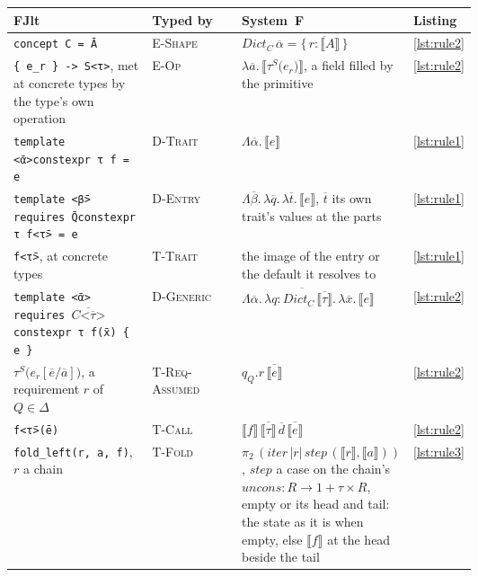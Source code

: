 \begin{table}[ht]
\centering
\small
\begin{tabularx}{\linewidth}{@{}>{\raggedright\arraybackslash}p{0.31\linewidth}>{\raggedright\arraybackslash}p{0.2\linewidth}>{\raggedright\arraybackslash}X>{\raggedright\arraybackslash}p{0.09\linewidth}@{}}
\toprule
FJlt & Typed by & System~F & Listing \\
\midrule
\texttt{concept C = Ā} & \textsc{E-Shape} & $\mathit{Dict}_C\,\overline{\alpha} = \{\,\overline{r : \llbracket A \rrbracket}\,\}$ & \ref{lst:rule2} \\
\texttt{\{ e\_r \} -> S<τ>}, met at concrete types by the type's own operation & \textsc{E-Op} & $\lambda\overline{a}.\,\llbracket \tau^{S}\texttt{(}e_r\texttt{)} \rrbracket$, a field filled by the primitive & \ref{lst:rule2} \\
\texttt{template <ᾱ>}\newline\texttt{constexpr τ f = e} & \textsc{D-Trait} & $\Lambda\overline{\alpha}.\,\llbracket e \rrbracket$ & \ref{lst:rule1} \\
\texttt{template <β̄> requires Q̄}\newline\texttt{constexpr τ f<τ̄> = e} & \textsc{D-Entry} & $\Lambda\overline{\beta}.\,\lambda\overline{q}.\,\lambda\overline{t}.\,\llbracket e \rrbracket$, $\overline{t}$ its own trait's values at the parts & \ref{lst:rule1} \\
\texttt{f<τ̄>}, at concrete types & \textsc{T-Trait} & the image of the entry or the default it resolves to & \ref{lst:rule1} \\
\texttt{template <ᾱ> requires }$\overline{C\texttt{<}\overline{\tau}\texttt{>}}$\newline\texttt{constexpr τ f(x̄) \{ e \}} & \textsc{D-Generic} & $\Lambda\overline{\alpha}.\,\lambda\overline{q : \mathit{Dict}_C\,\overline{\llbracket \tau \rrbracket}}.\,\lambda\overline{x}.\,\llbracket e \rrbracket$ & \ref{lst:rule2} \\
$\tau^{S}\texttt{(}e_r[\overline{e}/\overline{a}]\texttt{)}$, a requirement $r$ of $Q \in \Delta$ & \textsc{T-Req-Assumed} & $q_Q.r\,\overline{\llbracket e \rrbracket}$ & \ref{lst:rule2} \\
\texttt{f<τ̄>(ē)} & \textsc{T-Call} & $\llbracket f \rrbracket\,\overline{\llbracket \tau \rrbracket}\,\overline{d}\,\overline{\llbracket e \rrbracket}$ & \ref{lst:rule2} \\
\texttt{fold\_left(r, a, f)}, $r$ a chain & \textsc{T-Fold} & $\pi_2\,(\mathit{iter}\,|r|\,\mathit{step}\,(\llbracket r \rrbracket, \llbracket a \rrbracket))$, $\mathit{step}$ a case on the chain's $\mathit{uncons} : R \to 1 + \tau \times R$, empty or its head and tail: the state as it is when empty, else $\llbracket f \rrbracket$ at the head beside the tail & \ref{lst:rule3} \\

\end{tabularx}
\end{table}
